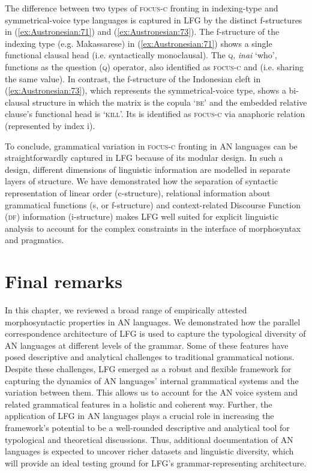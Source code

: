 \documentclass[output=paper,chinesefont]{../langscibook}
\begin{document}
The difference between two types of \textsc{focus-c} fronting in indexing-type and symmetrical-voice type languages is captured in LFG by the distinct f-structures in (\ref{ex:Austronesian:71}) and (\ref{ex:Austronesian:73}). The f-structure of the indexing type (e.g. Makassarese) in (\ref{ex:Austronesian:71}) shows a single functional clausal \PRED head (i.e. syntactically monoclausal). The \textsc{q}, \emph{inai} `who', functions as the question (\textsc{q}) operator, also identified as \textsc{focus-c} and \OBJ (i.e. sharing the same value). In contrast, the f-structure of the Indonesian cleft in (\ref{ex:Austronesian:73}), which represents the symmetrical-voice type, shows a bi-clausal structure in which the matrix \PRED is the copula `\textsc{be}' and the embedded relative clause's functional head is `\textsc{kill}\arglist{\SUBJ, \OBJ}'. Its \SUBJ is identified as \textsc{focus-c} via anaphoric relation (represented by index i).

To conclude, grammatical variation in \textsc{focus-c} fronting in AN languages can be straightforwardly captured in LFG because of its modular design. In such a design, different dimensions of linguistic information are modelled in separate layers of structure. We have demonstrated how the separation of syntactic representation of linear order (c-structure), relational information about grammatical functions ({\GF}s, or f-structure) and context-related Discourse Function (\textsc{df}) information (i-structure) makes LFG well suited for explicit linguistic analysis to account for the complex constraints in the interface of morphosyntax and pragmatics.

\section{Final remarks}
\label{sec:Austronesian:7}

In this chapter, we reviewed a broad range of empirically attested morphosyntactic properties in AN languages. We demonstrated how the parallel correspondence architecture of LFG is used to capture the typological diversity of AN languages at different levels of the grammar. Some of these features have posed descriptive and analytical challenges to traditional grammatical notions. Despite these challenges, LFG emerged as a robust and flexible framework for capturing the dynamics of AN languages' internal grammatical systems and the variation between them. This allows us to account for the AN voice system and related grammatical features in a holistic and coherent way. Further, the application of LFG in AN languages plays a crucial role in increasing the framework's potential to be a well-rounded descriptive and analytical tool for typological and theoretical discussions. Thus, additional documentation of AN languages is expected to uncover richer datasets and linguistic diversity, which will provide an ideal testing ground for LFG's grammar-representing architecture.
\end{document}

